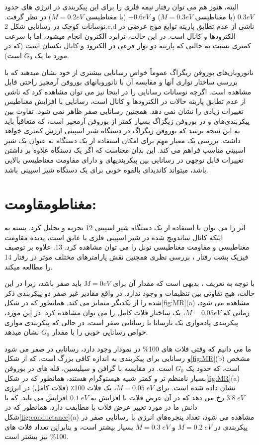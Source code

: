 البته، هنوز هم می توان رفتار نیمه فلزی را برای این پیکربندی در انرژی های حدود $0.3 eV$ (با مغناطیسی $M = 0.3 eV$) و $-0.6 eV$ (با مغناطیسی $M = 0.2 eV$) در نظر گرفت. نوسانات کوچک در رسانایی شکل 2.c,d ناشی از عدم تطابق پاریته توابع موج عرضی در الکترودها و کانال است. در این حالت، ترابرد الکترون انجام میشود، اما با سرعت کمتری نسبت به حالتی که پاریته دو نوار فرعی در الکترود و کانال یکسان است (که در مورد ما یک $G_0$ است).

نانوروبان‌های بوروفن زیگزاگ عموماً خواص رسانایی بیشتری از خود نشان میدهند که با بررسی ساختار نواری آنها و مقایسه آن با نانوروبانهای بوروفن آرمچیر راحتی قابل مشاهده است. اگرچه نوسانات رسانایی را در اینجا نیز می توان مشاهده کرد که ناشی از عدم تطابق پاریته حالات در الکترودها و کانال است، رسانایی با افزایش مغناطیس تغییرات زیادی را نشان نمی دهد. همچنین رسانایی صفر ظاهر نمی شود. تفاوت بین پیکربندی‌های  و  در بوروفن زیگزاگ بسیار کمتر از بوروفن آرمچیر است، که متعاقباً باید به این نتیجه برسد که بوروفن زیگزاگ در دستگاه شیر اسپینی ارزش کمتری خواهد داشت. بررسی  یک معیار مهم برای امکان استفاده از یک دستگاه به عنوان یک شیر اسپینی مناسب فراهم می کند. این بدان معناست که اگر یک دستگاه علاوه بر داشتن تغییرات قابل توجهی در رسانایی بین پیکربندیهای  و  دارای مقاومت مغناطیسی بالایی باشد، میتواند کاندیدای بالقوه خوبی برای یک دستگاه شیر اسپینی باشد.

\section{مغناطومقاومت:}
اثر  را می توان با استفاده از یک دستگاه شیر اسپینی 12 تجزیه و تحلیل کرد. بسته به اینکه کانال ساندویچ شده در شیر اسپینی فلزی یا عایق است، پدیده مقاومت مغناطیسی  و مقاومت مغناطیسی تونل  را می توان مشاهده کرد. 13. علاوه بر توصیف فیزیک پشت رفتار ، بررسی نظری  همچنین نقش پارامترهای مختلف موثر در رفتار  14 را مطالعه میکند.

با توجه به تعریف ، بدیهی است که مقدار آن برای $M = 0 eV$ باید صفر باشد، زیرا در این حالت، هیچ تفاوتی بین تنظیمات  و  وجود ندارد. در واقع مقادیر غیر صفر  دو پیکربندی ذکر شده را از یکدیگر متمایز می کند. همانطور که در شکل\ref{fig:MR}(a) مشاهده می شود، زمانی که $M = 0.05 eV$، یک ساختار فلات کامل را می توان مشاهده کرد. در این مورد، پیکربندی پادموازی یک نارسانا با رسانایی صفر است، در حالی که پیکربندی موازی خواص رسانایی خوبی را با مقدار $G_0$ نشان میدهد. 

ما می دانیم که وقتی فلات های 100\% در نمودار  وجود دارد، رسانایی در  صفر می شود و رسانایی برای پیکربندی  به اندازه کافی بزرگ است، که از شکل\ref{fig:MR}(b) مشخص است، که حدود یک $G_0$ است. در مقایسه با گرافن و سیلیسین، قله های  در بوروفن بسیار نامنظم تر و کمتر شبیه هیستوگرام هستند، همانطور که در شکل\ref{fig:MR}(a) نشان داده شده است. برای $M = 0.05\; eV$، یک فلات 100٪ (فلات کامل) در انرژی $3.8\; eV$ رخ می دهد که در آن عرض فلات با افزایش  به $0.1\; eV$ افزایش می یابد. که با دانش ما در مورد تغییر عرض فلات با  مطابقت دارد.
همانطور که در شکل\ref{fig:conductance}(a) مشاهده می شود، تعداد پنجره‌های انرژی با رسانایی صفر در پیکربندی  در $M = 0.2\; eV$ و $M = 0.3\; eV$ بسیار بیشتر است، و بنابراین تعداد فلات های 100\% نیز بیشتر است. 

